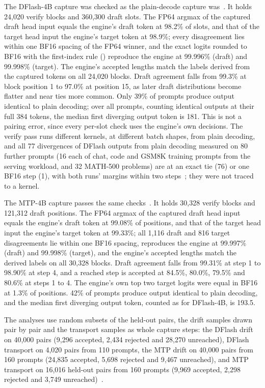 The DFlash-4B capture was checked as the plain-decode capture was~. It holds 24,020 verify blocks and 360,300 draft slots. The FP64 argmax of the captured draft head input equals the engine's draft token at 98.2\% of slots, and that of the target head input the engine's target token at 98.9\%; every disagreement lies within one BF16 spacing of the FP64 winner, and the exact logits rounded to BF16 with the first-index rule (\Rbf) reproduce the engine at 99.996\% (draft) and 99.998\% (target). The engine's accepted lengths match the labels derived from the captured tokens on all 24,020 blocks. Draft agreement falls from 99.3\% at block position 1 to 97.0\% at position 15, as later draft distributions become flatter and near ties more common. Only 39\% of prompts produce output identical to plain decoding; over all prompts, counting identical outputs at their full 384 tokens, the median first diverging output token is 181. This is not a pairing error, since every per-slot check uses the engine's own decisions. The verify pass runs different kernels, at different batch shapes, from plain decoding, and all 77 divergences of DFlash outputs from plain decoding measured on 80 further prompts (16 each of chat, code and GSM8K training prompts from the serving workload, and 32 MATH-500 problems) are at an exact tie (76) or one BF16 step (1), with both runs' margins within two steps~; they were not traced to a kernel.

The MTP-4B capture passes the same checks~. It holds 30,328 verify blocks and 121,312 draft positions. The FP64 argmax of the captured draft head input equals the engine's draft token at 99.08\% of positions, and that of the target head input the engine's target token at 99.33\%; all 1,116 draft and 816 target disagreements lie within one BF16 spacing, \Rbf{} reproduces the engine at 99.997\% (draft) and 99.998\% (target), and the engine's accepted lengths match the derived labels on all 30,328 blocks. Draft agreement falls from 99.31\% at step 1 to 98.90\% at step 4, and a reached step is accepted at 84.5\%, 80.0\%, 79.5\% and 80.6\% at steps 1 to 4. The engine's own top two target logits were equal in BF16 at 1.3\% of positions. 42\% of prompts produce output identical to plain decoding, and the median first diverging output token, counted as for DFlash-4B, is 193.5.

The analyses use random subsets of the held-out pairs, the drift samples drawn pair by pair and the transport samples as whole capture steps: the DFlash drift on 40,000 pairs (9,296 accepted, 2,434 rejected and 28,270 unreached), DFlash transport on 4,020 pairs from 110 prompts, the MTP drift on 40,000 pairs from 160 prompts (24,835 accepted, 5,698 rejected and 9,467 unreached), and MTP transport on 16,016 held-out pairs from 160 prompts (9,969 accepted, 2,298 rejected and 3,749 unreached)~.

